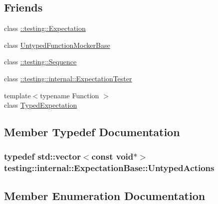 \subsection*{Friends}
\begin{DoxyCompactItemize}
\item 
class \hyperlink{classtesting_1_1internal_1_1_expectation_base_a86fa3dccdc465d897ee321b74e4ce915}{\+::testing\+::\+Expectation}
\item 
class \hyperlink{classtesting_1_1internal_1_1_expectation_base_a3e5598b244ec7673d0a494477d71e559}{Untyped\+Function\+Mocker\+Base}
\item 
class \hyperlink{classtesting_1_1internal_1_1_expectation_base_aeaf43a487a21c0ac1135b094a1561056}{\+::testing\+::\+Sequence}
\item 
class \hyperlink{classtesting_1_1internal_1_1_expectation_base_a83859ffda7f75bb8b447063eb53cb8b8}{\+::testing\+::internal\+::\+Expectation\+Tester}
\item 
{\footnotesize template$<$typename Function $>$ }\\class \hyperlink{classtesting_1_1internal_1_1_expectation_base_a4f17de55396a8ef740d5ad2b1380a851}{Typed\+Expectation}
\end{DoxyCompactItemize}


\subsection{Member Typedef Documentation}
\subsubsection[{\texorpdfstring{Untyped\+Actions}{UntypedActions}}]{\setlength{\rightskip}{0pt plus 5cm}typedef std\+::vector$<$const void$\ast$$>$ {\bf testing\+::internal\+::\+Expectation\+Base\+::\+Untyped\+Actions}\hspace{0.3cm}{\ttfamily [protected]}}\hypertarget{classtesting_1_1internal_1_1_expectation_base_a9b21e82059961b9f1198d3f5d518254f}{}\label{classtesting_1_1internal_1_1_expectation_base_a9b21e82059961b9f1198d3f5d518254f}


\subsection{Member Enumeration Documentation}
